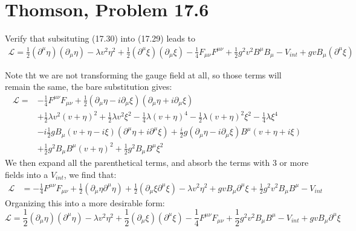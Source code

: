 \documentclass[12pt]{article}
\renewcommand{\L}{\mathcal{L}}
\newcommand{\D}{\partial}
\begin{document}
\section{Thomson, Problem 17.6}
\begin{problem}
  Verify that subsituting (17.30) into (17.29) leads to
  \begin{align*}
    \L=\frac12(\D^\mu\eta)(\D_\mu\eta)-\lambda v^2\eta^2
    +\frac12(\D^\mu\xi)(\D_\mu\xi)-\frac14 F_{\mu\nu}F^{\mu\nu}
    +\frac12g^2v^2B^\mu B_\mu-V_{int}+gv B_\mu(\D^\mu\xi)
  \end{align*}
\end{problem}
Note tht we are not transforming the gauge field at all, so those terms will remain the same, the bare substitution gives:
\begin{align*}
  \L=&-\frac14 F^{\mu\nu}F_{\mu\nu}
  +\frac12(\D_\mu\eta-i\D_\mu\xi)(\D_\mu\eta+i\D_\mu\xi)\\
  &+\frac12\lambda v^2(v+\eta)^2+\frac12\lambda v^2\xi^2
  -\frac14\lambda(v+\eta)^4-\frac12\lambda(v+\eta)^2\xi^2-\frac14\lambda\xi^4\\
  &-i\frac12gB_\mu(v+\eta-i\xi)(\D^\mu\eta+i\D^\mu\xi)
  +\frac{i}2g(\D_\mu\eta-i\D_\mu\xi)B^\mu(v+\eta+i\xi)\\
  &+\frac12g^2B_\mu B^\mu(v+\eta)^2+\frac12g^2B_\mu B^\mu\xi^2
\end{align*}
We then expand all the parenthetical terms, and absorb the terms with 3 or more fields into a $V_{int}$, we find that:
\begin{align*}
  \L&=-\frac14F^{\mu\nu}F_{\mu\nu}+\frac12(\D_\mu\eta\D^\mu\eta)
  +\frac12(\D_\mu\xi\D^\mu\xi)-\lambda v^2\eta^2
  +gvB_\mu\D^\mu\xi+\frac12g^2v^2B_\mu B^\mu-V_{int}
\end{align*}
Organizing this into a more desirable form:
\begin{equation}
  \label{eq:p2}
  \boxed{\L=\frac12(\D_\mu\eta)(\D^\mu\eta)-\lambda v^2\eta^2
  +\frac12(\D_\mu\xi)(\D^\mu\xi)
  -\frac14F^{\mu\nu}F_{\mu\nu}+\frac12g^2v^2B_\mu B^\mu-V_{int}
  +gvB_\mu\D^\mu\xi}
\end{equation}
\newpage
\end{document}
